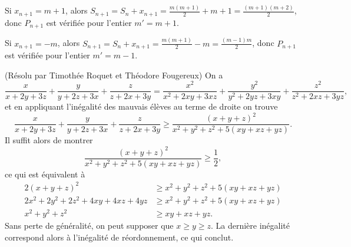\begin{sol}[82]
Si $x_{n+1}=m+1$, alors $S_{n+1}=S_n+x_{n+1}=\frac{m(m+1)}{2}+m+1=\frac{(m+1)(m+2)}{2}$, donc $P_{n+1}$ est v\'erifi\'ee pour l'entier $m'=m+1$.

Si $x_{n+1}=-m$, alors $S_{n+1}=S_n+x_{n+1}=\frac{m(m+1)}{2}-m=\frac{(m-1)m}{2}$, donc $P_{n+1}$ est v\'erifi\'ee pour l'entier $m'=m-1$.

\end{sol}

\begin{sol}[83](R\'esolu par Timoth\'ee Roquet et Th\'eodore Fougereux)
On a
\[\frac{x}{x+2y+3z}+\frac{y}{y+2z+3x}+\frac{z}{z+2x+3y}=\frac{x^2}{x^2+2xy+3xz}+\frac{y^2}{y^2+2yz+3xy}+\frac{z^2}{z^2+2xz+3yz},\]
et en appliquant l'in\'egalit\'e des mauvais \'el\`eves au terme de droite on trouve
\[\frac{x}{x+2y+3z}+\frac{y}{y+2z+3x}+\frac{z}{z+2x+3y}\geq \frac{(x+y+z)^2}{x^2+y^2+z^2+5(xy+xz+yz)}.\]
Il suffit alors de montrer
\[\frac{(x+y+z)^2}{x^2+y^2+z^2+5(xy+xz+yz)}\geq \frac12,\]
ce qui est \'equivalent \`a
\begin{align*}
2(x+y+z)^2 &\geq x^2+y^2+z^2+5(xy+xz+yz)\\
2x^2+2y^2+2z^2+4xy+4xz+4yz &\geq x^2+y^2+z^2+5(xy+xz+yz)\\
x^2+y^2+z^2 &\geq xy+xz+yz.
\end{align*}
Sans perte de g\'en\'eralit\'e, on peut supposer que $x\geq y\geq z$. La derni\`ere in\'egalit\'e correspond alors \`a l'in\'egalit\'e de r\'eordonnement, ce qui conclut.

\end{sol}

